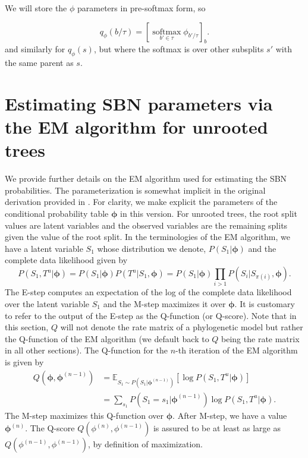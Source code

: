 \documentclass{article}
\newcommand{\E}{\mathbb{E}}
\newcommand{\softmax}{\operatorname*{softmax}}
\begin{document}
We will store the $\phi$ parameters in pre-softmax form, so

\[
    q_\phi(b \slash \tau) = \left[ \softmax_{b' \in \tau} \phi_{b' \slash \tau} \right]_b .
\]
and similarly for $q_\phi(s)$, but where the softmax is over other subsplits $s'$ with the same parent as $s$.


\section*{Estimating SBN parameters via the EM algorithm for unrooted trees}

We provide further details on the EM algorithm used for estimating the SBN probabilities.
The parameterization is somewhat implicit in the original derivation provided in \cite{Zhang2018-mm}.
For clarity, we make explicit the parameters of the conditional probability table $\bm{\phi}$ in this version.
For unrooted trees, the root split values are latent variables and the observed variables are the remaining splits given the value of the root split.
In the terminologies of the EM algorithm, we have a latent variable $S_1$ whose distribution we denote, $P(S_1 | \bm{\phi})$ and the complete data likelihood given by
\begin{equation}
    P(S_1, T^u | \bm{\phi}) = P(S_1 | \bm{\phi}) P(T^u | S_1, \bm{\phi}) = P(S_1 | \bm{\phi}) \prod\limits_{i > 1} P(S_i | S_{\pi(i)}, \bm{\phi}).
\end{equation}
The E-step computes an expectation of the log of the complete data likelihood over the latent variable $S_1$ and the M-step maximizes it over $\bm{\phi}$.
It is customary to refer to the output of the E-step as the Q-function (or Q-score).
Note that in this section, $Q$ will not denote the rate matrix of a phylogenetic model but rather the Q-function of the EM algorithm (we default back to $Q$ being the rate matrix in all other sections).
The Q-function for the $n$-th iteration of the EM algorithm is given by
\begin{align*}
    Q(\bm{\phi}, \bm{\phi}^{(n-1)}) &= \E_{S_1 \sim P(S_1 | \bm{\phi}^{(n-1)})}\left[ \log P(S_1, T^u | \bm{\phi}) \right] \\
    &= \sum\limits_{s_1} P(S_1 = s_1 | \bm{\phi}^{(n-1)}) \log P(S_1, T^u | \bm{\phi}).
\end{align*}
The M-step maximizes this Q-function over $\bm{\phi}$. After M-step, we have a value $\bm{\phi}^{(n)}$.
The Q-score $Q(\phi^{(n)}, \phi^{(n-1)})$ is assured to be at least as large as $Q(\phi^{(n-1)}, \phi^{(n-1)})$, by definition of maximization.
\end{document}
